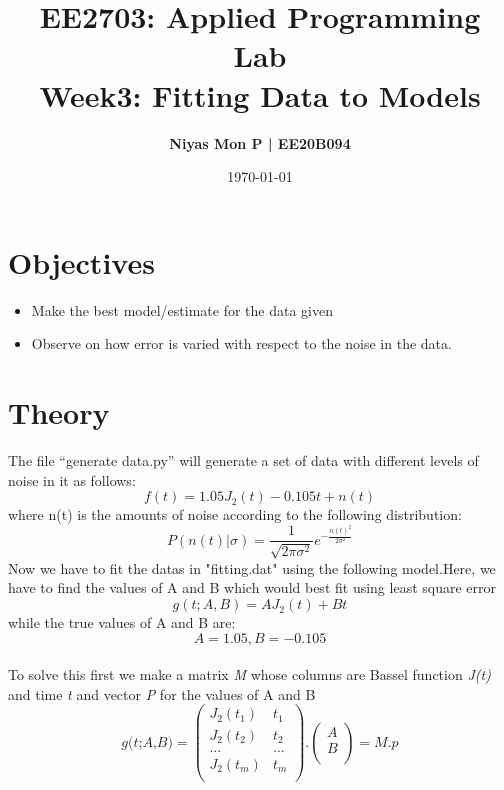 \documentclass[11pt, a4paper]{article}
\title{\centering \textbf{EE2703: Applied Programming Lab\\Week3: Fitting Data to Models }} %
\author{\textbf{Niyas Mon P | EE20B094}} %
\date{\today} %
\begin{document}
    \maketitle{} %

    \section{Objectives}
        \begin{itemize}
            \item Make the best model/estimate for the data given
            \item Observe on how error is varied with respect to the noise in the data.
        \end{itemize}
    \section{Theory}
        The file “generate data.py” will generate a set of data with different levels of noise in it as follows:
        \begin{equation}
                f(t) = 1.05J_2(t)-0.105t+n(t)
            \end{equation}
        where n(t) is the amounts of noise according to the following distribution:
        \begin{equation}
                P(n(t)|\sigma)=\frac{1}{\sqrt{2\pi\sigma^2}}e^{-\frac{n(t)^2}{2\sigma^2}} \label{eq1}
            \end{equation}
        Now we have to fit the datas in "fitting.dat" using the following model.Here, we have to find the values of A and B which would best fit using least square error
        \begin{equation}
            g(t;A,B) = AJ_2(t)+Bt
        \end{equation}
        while the true values of A and B are:
        \begin{equation}
            A = 1.05 , B = -0.105
        \end{equation}
        \\
        To solve this first we make a matrix \textit{M} whose columns are Bassel function \textit{J(t)} and time \textit{t} and vector \textit{P} for the values of A and B \\
                \begin{equation}
                \textit{g(t;A,B)} = 
            \left(\begin{matrix}
            J_2(t_1) & t_1\\
            J_2(t_2) & t_2\\
            ... & ...\\
            J_2(t_m) & t_m\\
            \end{matrix}\right)
            .
            \left(\begin{matrix}
            A\\
            B\\
            \end{matrix}\right)
             = \textit{M.p}
        \end{equation}
\end{document}
